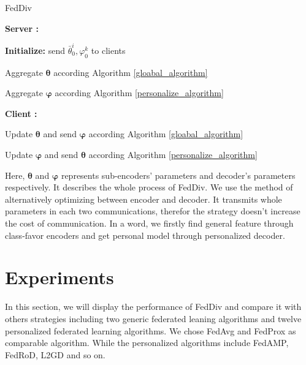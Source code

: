 \documentclass[journal]{IEEEtran}
\begin{document}
\begin{algorithm}
	\caption{FedDiv}\label{FedDiv_algorithm}
	
	\begin{algorithmic}[1]
		 
		\item \textbf{Server :}
		\item \enspace\textbf{Initialize:} send $\bar{\theta}^{i}_{0},\varphi^{k}_{0} $ to clients
		
		\item \enspace Aggregate $\boldsymbol{\theta}$ according Algorithm \ref{gloabal_algorithm}
		
		\item\enspace Aggregate $\boldsymbol{\varphi}$ according Algorithm \ref{personalize_algorithm}
		
		\item\textbf{Client :} 
		
		\item\enspace Update $\boldsymbol{\theta}$ and send $\boldsymbol{\varphi}$ according Algorithm \ref{gloabal_algorithm}
		
		\item\enspace Update $\boldsymbol{\varphi}$ and send $\boldsymbol{\theta}$ according Algorithm \ref{personalize_algorithm}

	\end{algorithmic}
	
\end{algorithm}
Here, $\boldsymbol{\theta}$ and $\boldsymbol{\varphi}$ represents sub-encoders' parameters and decoder's parameters respectively. It describes the whole process of FedDiv. We use the method of alternatively optimizing between encoder and decoder. It transmits whole parameters in each two communications, therefor the strategy doesn't increase the cost of communication. In a word, we firstly find general feature through class-favor encoders and get personal model through personalized decoder.

\section{Experiments}
In this section, we will display the performance of FedDiv and compare it with others strategies including two generic federated leaning algorithms and twelve personalized federated learning algorithms. We chose FedAvg\cite{McMahan2016CommunicationEfficientLO} and FedProx\cite{Sahu2018FederatedOI} as comparable algorithm. While the personalized algorithms include FedAMP\cite{Huang2020PersonalizedCF}, FedRoD\cite{Chen2022OnBG}, L2GD\cite{Hanzely2020FederatedLO} and so on.
\end{document}
